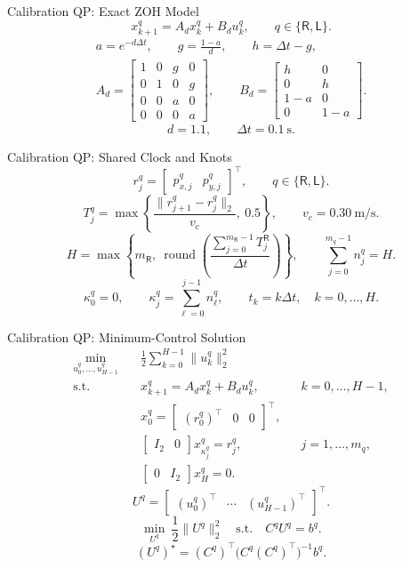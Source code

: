 \documentclass[aspectratio=43,11pt]{beamer}
\begin{document}
\begin{frame}{Calibration QP: Exact ZOH Model}
\[
x^q_{k+1}=A_d x^q_k+B_d u^q_k,
\qquad
q\in\{\mathsf R,\mathsf L\}.
\]
\[
\begin{gathered}
a=e^{-d\Delta t},\qquad
g=\frac{1-a}{d},\qquad
h=\Delta t-g,\\[0.4em]
A_d=
\begin{bmatrix}
1&0&g&0\\
0&1&0&g\\
0&0&a&0\\
0&0&0&a
\end{bmatrix},
\qquad
B_d=
\begin{bmatrix}
h&0\\
0&h\\
1-a&0\\
0&1-a
\end{bmatrix}.
\end{gathered}
\]
\[
d=1.1,\qquad \Delta t=0.1\ \mathrm{s}.
\]
\end{frame}

\begin{frame}{Calibration QP: Shared Clock and Knots}
\small
\[
r_j^q=\begin{bmatrix}p_{x,j}^q&p_{y,j}^q\end{bmatrix}^{\!\top},
\qquad q\in\{\mathsf R,\mathsf L\}.
\]
\[
T_j^q=\max\!\left\{
\frac{\lVert r_{j+1}^q-r_j^q\rVert_2}{v_c},\ 0.5
\right\},
\qquad v_c=0.30\ \mathrm{m/s}.
\]
\[
H=\max\!\left\{m_{\mathsf R},\
\operatorname{round}\!\left(\frac{\sum_{j=0}^{m_{\mathsf R}-1}T_j^{\mathsf R}}{\Delta t}\right)\right\},
\qquad
\sum_{j=0}^{m_q-1}n_j^q=H.
\]
\[
\kappa_0^q=0,\qquad
\kappa_j^q=\sum_{\ell=0}^{j-1}n_\ell^q,\qquad
t_k=k\Delta t,\quad k=0,\ldots,H.
\]
\end{frame}

\begin{frame}{Calibration QP: Minimum-Control Solution}
\small
\[
\begin{aligned}
\min_{u_0^q,\ldots,u_{H-1}^q}\quad
&\frac{1}{2}\sum_{k=0}^{H-1}\lVert u_k^q\rVert_2^2\\
\mathrm{s.t.}\quad
&x^q_{k+1}=A_d x^q_k+B_d u^q_k,
&&k=0,\ldots,H-1,\\
&x_0^q=\begin{bmatrix}(r_0^q)^\top&0&0\end{bmatrix}^{\!\top},\\
&\begin{bmatrix}I_2&0\end{bmatrix}x^q_{\kappa_j^q}=r_j^q,
&&j=1,\ldots,m_q,\\
&\begin{bmatrix}0&I_2\end{bmatrix}x^q_H=0.
\end{aligned}
\]
\[
U^q=\begin{bmatrix}(u_0^q)^\top&\cdots&(u_{H-1}^q)^\top\end{bmatrix}^{\!\top}.
\]
\[
\min_{U^q}\ \frac12\lVert U^q\rVert_2^2
\quad\mathrm{s.t.}\quad C^qU^q=b^q.
\]
\[
\boxed{(U^q)^\star=(C^q)^\top\big(C^q(C^q)^\top\big)^{-1}b^q.}
\]
\end{frame}
\end{document}
